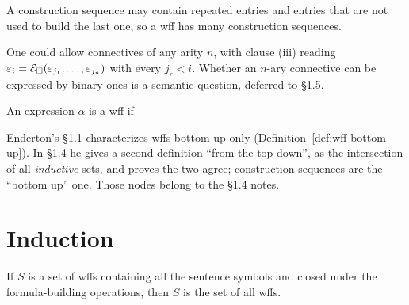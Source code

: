 \documentclass[11pt]{article}
\begin{document}
\begin{remark}
A construction sequence may contain repeated entries and entries that are
not used to build the last one, so a wff has many construction sequences.
\end{remark}

\begin{remark}
One could allow connectives of any arity $n$, with clause (iii) reading
$\varepsilon_i=\mathcal{E}_{\square}(\varepsilon_{j_1},\dots,\varepsilon_{j_n})$ with
every $j_r<i$. Whether an $n$-ary connective can be expressed by binary ones
is a semantic question, deferred to \S1.5.
\end{remark}

\begin{definition}\label{def:wff-bottom-up}
An expression $\alpha$ is a wff if
\end{definition}

\begin{definition}\label{def:closed}
\end{definition}

\begin{remark}
Enderton's \S1.1 characterizes wffs bottom-up only
(Definition~\ref{def:wff-bottom-up}). In \S1.4 he gives a second
definition ``from the top down'', as the intersection of all
\emph{inductive} sets, and proves the two agree; construction sequences are
the ``bottom up'' one. Those nodes belong to the \S1.4 notes.
\end{remark}

\section{Induction}

\begin{theorem}\label{thm:induction-principle}
If $S$ is a set of wffs containing all the sentence symbols and closed under
the formula-building operations, then $S$ is the set of all wffs.
\end{theorem}
\end{document}

